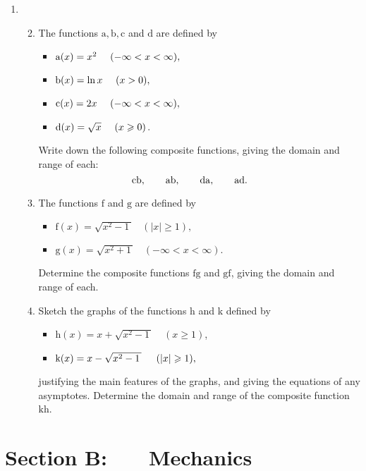 \documentclass[a4, 11pt]{report}
\newlength{\qspace}
\newcounter{qnumber}
\newenvironment{question}%
 {\vspace{\qspace}
  \begin{enumerate}[\bfseries 1\quad][10]%
    \setcounter{enumi}{\value{qnumber}}%
    \item%
 }
{
  \end{enumerate}
  \filbreak
  \stepcounter{qnumber}
 }
\newenvironment{questionparts}[1][1]%
 {
  \begin{enumerate}[\bfseries (i)]%
    \setcounter{enumii}{#1}
    \addtocounter{enumii}{-1}
    \setlength{\itemsep}{5mm}
    \setlength{\parskip}{8pt}
 }
 {
  \end{enumerate}
 }
\def\g{{\mathrm g}}
\def\h{{\mathrm h}}
\def\f{{\mathrm f}}
\def\ge{\geqslant}
\begin{document}
\begin{question}
\begin{questionparts}
\item
The functions $\mathrm{a, b, c}$ and $\mathrm{d}$ are defined 
by
\begin{itemize}
\item[]
${\rm a}(x) =x^2 \ \ \ \ (-\infty<x<\infty),$
\item[]
${\rm b}(x) = \ln x  \ \  \ \ (x>0),$
\item[]
${\rm c}(x) =2x \ \ \ \     (-\infty<x<\infty),$
\item[]
${\rm d}(x)= \sqrt x  \ \ \ \ (x\ge0) \,.$
\end{itemize}
Write down the following composite
functions, giving  the domain and range of each:
\[
\rm 
cb, \ \ \ \ \ \
ab, \ \ \ \ \ \
da, \ \ \ \ \ \
ad. \ \ \ \ \ \ 
\]

\item The functions $\mathrm{f}$ and $\mathrm{g}$ are defined 
 by
\begin{itemize}
\item[] $ \f(x)= \sqrt{x^2-1\,} \ \ \ \ (\vert x \vert \ge 1),$
\item []        
$ \g(x) = \sqrt{x^2+1\,} \ \ \ \ (-\infty<x<\infty).$
\end{itemize}
Determine the composite functions $\mathrm{fg}$ and $\mathrm{gf}$, giving 
the domain and range of each.

\item Sketch the graphs of the functions h and k defined 
 by
\begin{itemize}
\item[]
$\h(x) = x+\sqrt{x^2-1\,}\, \ \ \ \ ( x \ge1)$,
\item[]
 ${\rm k}(x) = x-\sqrt{x^2-1\,}\, \ \ \ \ (\vert x\vert \ge1),$
\end{itemize}
justifying the main features of the graphs, and giving the equations of 
any asymptotes. Determine
the domain and range of the composite function
$\mathrm{kh}$.

\end{questionparts}
\end{question}	
		

		
	
\newpage
\section*{Section B: \ \ \ Mechanics}
\end{document}
